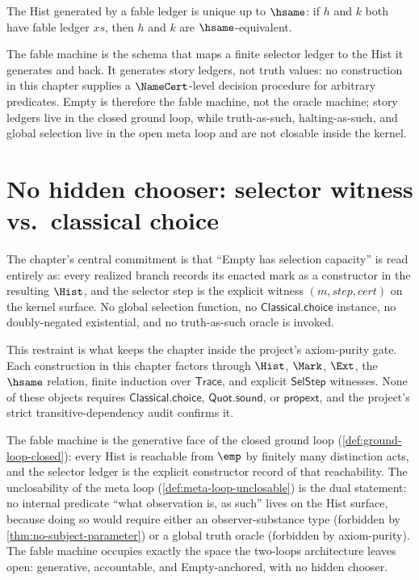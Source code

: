 \begin{theorem}
\label{thm:efm-fable-unique}
The Hist generated by a fable ledger is unique up to $\hsame$: if $h$ and $k$ both have fable ledger $xs$, then $h$ and $k$ are $\hsame$-equivalent.
\end{theorem}

\begin{remark}
\label{rem:efm-fable-not-oracle}
The fable machine is the schema that maps a finite selector ledger to the Hist it generates and back. It generates story ledgers, not truth values: no construction in this chapter supplies a $\NameCert$-level decision procedure for arbitrary predicates. Empty is therefore the fable machine, not the oracle machine; story ledgers live in the closed ground loop, while truth-as-such, halting-as-such, and global selection live in the open meta loop and are not closable inside the kernel.
\end{remark}

\section{No hidden chooser: selector witness vs.\ classical choice}
\label{sec:efm-no-hidden-chooser}

The chapter's central commitment is that ``Empty has selection capacity'' is read entirely as: every realized branch records its enacted mark as a constructor in the resulting $\Hist$, and the selector step is the explicit witness $(m, \mathit{step}, \mathit{cert})$ on the kernel surface. No global selection function, no $\mathsf{Classical.choice}$ instance, no doubly-negated existential, and no truth-as-such oracle is invoked.

This restraint is what keeps the chapter inside the project's axiom-purity gate. Each construction in this chapter factors through $\Hist$, $\Mark$, $\Ext$, the $\hsame$ relation, finite induction over $\mathsf{Trace}$, and explicit $\mathsf{SelStep}$ witnesses. None of these objects requires $\mathsf{Classical.choice}$, $\mathsf{Quot.sound}$, or $\mathsf{propext}$, and the project's strict transitive-dependency audit confirms it.

\begin{remark}
\label{rem:efm-two-loops-alignment}
The fable machine is the generative face of the closed ground loop (\autoref{def:ground-loop-closed}): every Hist is reachable from $\emp$ by finitely many distinction acts, and the selector ledger is the explicit constructor record of that reachability. The unclosability of the meta loop (\autoref{def:meta-loop-unclosable}) is the dual statement: no internal predicate ``what observation is, as such'' lives on the Hist surface, because doing so would require either an observer-substance type (forbidden by \autoref{thm:no-subject-parameter}) or a global truth oracle (forbidden by axiom-purity). The fable machine occupies exactly the space the two-loops architecture leaves open: generative, accountable, and Empty-anchored, with no hidden chooser.
\end{remark}


